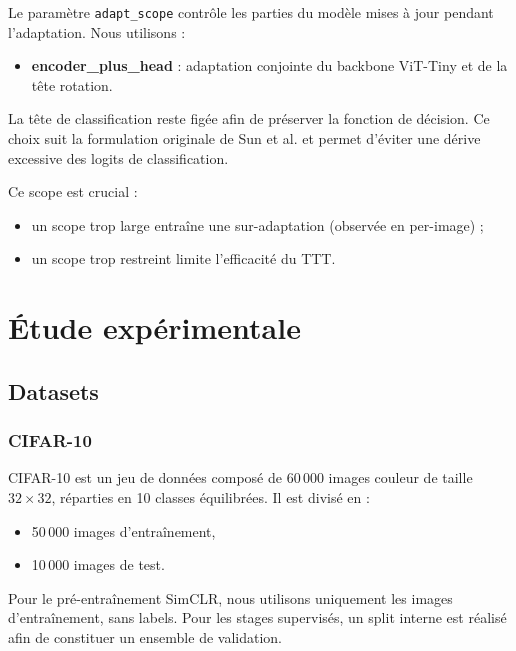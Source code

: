\documentclass[12pt,a4paper]{report}
\begin{document}
	Le paramètre \texttt{adapt\_scope} contrôle les parties du modèle mises à jour pendant l’adaptation.  
	Nous utilisons :
	\begin{itemize}
		\item \textbf{encoder\_plus\_head} : adaptation conjointe du backbone ViT-Tiny et de la tête rotation.
	\end{itemize}
	
	La tête de classification reste figée afin de préserver la fonction de décision.  
	Ce choix suit la formulation originale de Sun et al. et permet d’éviter une dérive excessive des logits de classification.
	
	Ce scope est crucial :  
	\begin{itemize}
		\item un scope trop large entraîne une sur-adaptation (observée en per-image) ;
		\item un scope trop restreint limite l’efficacité du TTT.
	\end{itemize}

	\chapter{Étude expérimentale}
	
	\section{Datasets}
	
	\subsection{CIFAR-10}
	CIFAR-10 est un jeu de données composé de 60\,000 images couleur de taille $32 \times 32$, réparties en 10 classes équilibrées. Il est divisé en :
	\begin{itemize}
		\item 50\,000 images d’entraînement,
		\item 10\,000 images de test.
	\end{itemize}
	
	Pour le pré-entraînement SimCLR, nous utilisons uniquement les images d’entraînement, sans labels. Pour les stages supervisés, un split interne est réalisé afin de constituer un ensemble de validation.
	
\end{document}
